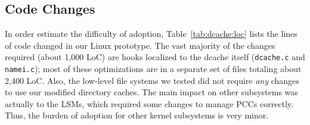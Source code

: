 

\subsection{Code Changes}

In order estimate the difficulty of adoption, Table~\ref{tab:dcache:loc} lists the lines of code changed in our Linux prototype.
The vast majority of the changes required (about 1,000 LoC)
are hooks localized to the dcache itself ({\tt dcache.c} and {\tt namei.c});
most of these optimizations are in a separate set of files totaling about 2,400 LoC.
Also, the low-level file systems we tested did not require {\em any} changes to use our modified directory caches.
The main impact on other subsystems was actually to the LSMs, which required some changes
to manage PCCs correctly. %
Thus, the burden of adoption for other kernel subsystems is very minor.

